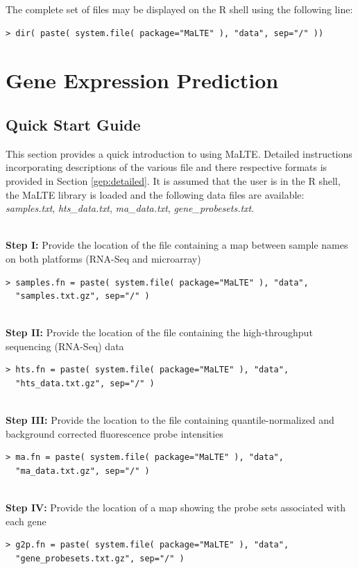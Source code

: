 \documentclass[a4paper,12pt]{article}
\begin{document}
The complete set of files may be displayed on the \textsf{R} shell using the following line:
\begin{verbatim}
> dir( paste( system.file( package="MaLTE" ), "data", sep="/" ))
\end{verbatim} 

\section{Gene Expression Prediction}
\label{gep}
\subsection{Quick Start Guide}
\label{gep:quick}
This section provides a quick introduction to using \textsf{MaLTE}. Detailed instructions incorporating descriptions of the various file and there respective formats is provided in Section \ref{gep:detailed}. It is assumed that the user is in the \textsf{R} shell, the \textsf{MaLTE} library is loaded and the following data files are available: \textit{samples.txt}, \textit{hts\_data.txt}, \textit{ma\_data.txt}, \textit{gene\_probesets.txt}.

\noindent\\
\textbf{Step I:} Provide the location of the file containing a map between sample names on both platforms (RNA-Seq and microarray)
\begin{verbatim}
> samples.fn = paste( system.file( package="MaLTE" ), "data", 
  "samples.txt.gz", sep="/" )
\end{verbatim}

\noindent\\
\textbf{Step II:} Provide the location of the file containing the high-throughput sequencing (RNA-Seq) data
\begin{verbatim}
> hts.fn = paste( system.file( package="MaLTE" ), "data", 
  "hts_data.txt.gz", sep="/" )
\end{verbatim}

\noindent\\
\textbf{Step III:} Provide the location to the file containing quantile-normalized and background corrected fluorescence probe intensities
\begin{verbatim}
> ma.fn = paste( system.file( package="MaLTE" ), "data", 
  "ma_data.txt.gz", sep="/" )
\end{verbatim}

\noindent\\
\textbf{Step IV:} Provide the location of a map showing the probe sets associated with each gene
\begin{verbatim}
> g2p.fn = paste( system.file( package="MaLTE" ), "data", 
  "gene_probesets.txt.gz", sep="/" )
\end{verbatim}
\end{document}
